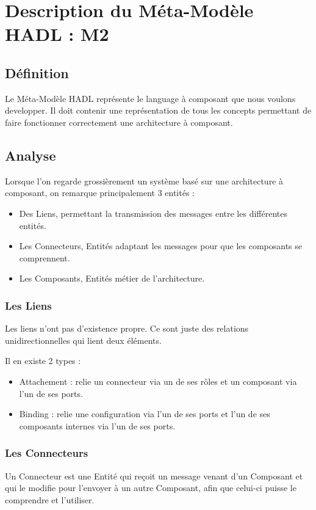 ﻿\chapter{Description du Méta-Modèle HADL : M2}

\section{Définition}

	Le Méta-Modèle HADL représente le language à composant que nous voulons developper. 
	Il doit contenir une représentation de tous les concepts permettant de faire fonctionner correctement une architecture à composant.
		
\section{Analyse}

Lorsque l'on regarde grossièrement un système basé sur une architecture à
composant, on remarque principalement 3 entités :
\begin{itemize}
	\item Des Liens, permettant la transmission des messages entre les différentes
	entités.
	\item Les Connecteurs, Entités adaptant les messages pour que les composants se
	comprennent.
	\item Les Composants, Entités métier de l'architecture.
\end{itemize}

\subsection{Les Liens}
	Les liens n'ont pas d'existence propre. Ce sont juste des relations
	unidirectionnelles qui lient deux éléments.
	
	Il en existe 2 types :
	\begin{itemize}
	\item Attachement : relie un connecteur via un de ses rôles et un composant via
	l'un de ses ports.
	\item Binding : relie une configuration via l'un de ses ports et l'un de ses
	composants internes via l'un de ses ports.
	\end{itemize}

\subsection{Les Connecteurs}
	Un Connecteur est une Entité qui reçoit un message venant d'un Composant et qui
	le modifie pour l'envoyer à un autre Composant, afin que celui-ci puisse le
	comprendre et l'utiliser.
	
